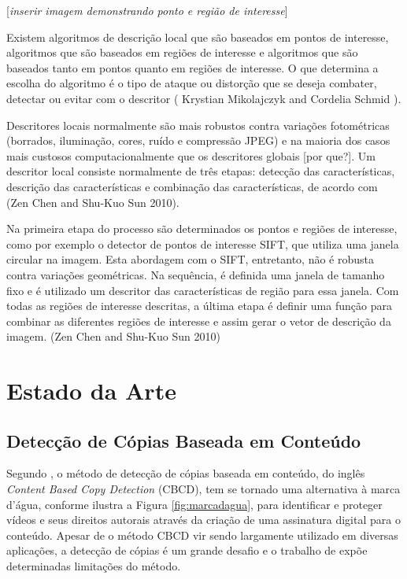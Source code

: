 [\textit{inserir imagem demonstrando ponto e região de interesse}]

Existem algoritmos de descrição local que são baseados em pontos de interesse, algoritmos que são baseados em regiões de interesse e algoritmos que são baseados tanto em pontos quanto em regiões de interesse. O que determina a escolha do algoritmo é o tipo de ataque ou distorção que se deseja combater, detectar ou evitar com o descritor ( Krystian Mikolajczyk and Cordelia Schmid ). 

Descritores locais normalmente são mais robustos contra variações fotométricas (borrados, iluminação, cores, ruído e compressão JPEG) e na maioria dos casos mais custosos computacionalmente que os descritores globais [por que?]. Um descritor local consiste normalmente de três etapas: detecção das características, descrição das características e combinação das características, de acordo com (Zen Chen and Shu-Kuo Sun 2010).

Na primeira etapa do processo são determinados os pontos e regiões de interesse, como por exemplo o detector de pontos de interesse SIFT, que utiliza uma janela circular na imagem. Esta abordagem com o SIFT, entretanto, não é robusta contra variações geométricas. Na sequência, é definida uma janela de tamanho fixo e é utilizado um descritor das características de região para essa janela. Com todas as regiões de interesse descritas, a última etapa é definir uma função para combinar as diferentes regiões de interesse e assim gerar o vetor de descrição da imagem. (Zen Chen and Shu-Kuo Sun 2010)



\chapter{Estado da Arte}
\label{chap:estadodaarte}

     \section{Detecção de Cópias Baseada em Conteúdo} 
	Segundo \citeauthor{jiang2011pku}, o método de detecção de cópias baseada em conteúdo, do inglês \textit{Content Based Copy Detection} (CBCD), tem se tornado uma alternativa à marca d'água, conforme ilustra a Figura \ref{fig:marcadagua}, para identificar e proteger vídeos e seus direitos autorais através da criação de uma assinatura digital para o conteúdo. Apesar de o método CBCD vir sendo largamente utilizado em diversas aplicações, a detecção de cópias é um grande desafio e o trabalho de \citeauthor{jiang2011pku} expõe determinadas limitações do método.
    
